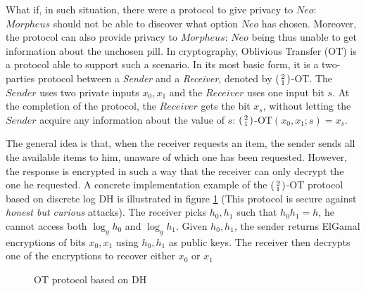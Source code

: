 What if, in such situation, there were a protocol to give privacy to
\(Neo\): \(Morpheus\) should not be able to discover what option \(Neo\) has chosen. Moreover, the
protocol can also provide privacy to \(Morpheus\): \(Neo\) being thus unable to get information about the unchosen pill. In cryptography, Oblivious Transfer (OT) is a
protocol able to support such a scenario. 
In its most basic form, it is a
two-parties protocol between a \textit{Sender} and a \textit{Receiver}, denoted
by \(\begin{psmallmatrix} 2 \\ 1 \end{psmallmatrix} \)-OT. The \(Sender\) uses
two private inputs \(x_{0}, x_{1}\) and the \(Receiver\) uses one input bit
\(s\). At the completion of the protocol, the \(Receiver\) gets the bit
\(x_{s}\), without letting the \(Sender\) acquire any information about the value of
\(s\): \(\begin{psmallmatrix} 2 \\ 1 \end{psmallmatrix}
\)-OT\((x_{0},x_{1};s) = x_{s}\).

The general idea is that, when the receiver requests an item, the sender sends
all the available items to him, unaware of which one has been requested. However, the response is encrypted in such a way that the receiver
can only decrypt the one he requested. A concrete implementation example of the
\(\begin{psmallmatrix} 2 \\ 1 \end{psmallmatrix} \)-OT protocol based on
discrete log DH is illustrated in figure \ref{fig:DH21OT} (This protocol is
secure against \textit{honest but curious} attacks). The receiver picks
\(h_{0},h_{1}\) such that \(h_{0}h_{1} = h\), he cannot access both
\(\log_{g}h_{0}\) and \(\log_{g}h_{1}\). Given \(h_{0}, h_{1}\), the sender
returns ElGamal encryptions of bits \(x_{0}, x_{1}\) using \(h_{0},h_{1}\) as
public keys. The receiver then decrypts one of the encryptions to recover either
\(x_{0} \text{ or } x_{1}\)

\begin{figure}[htbp!] 
  \centering
  \caption{OT protocol based on DH}
  \label{fig:DH21OT}
\end{figure}

